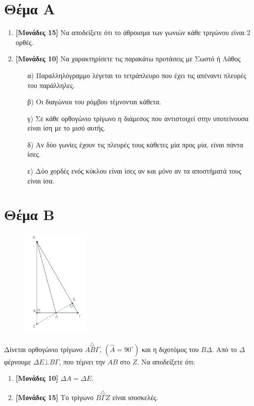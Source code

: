 \documentclass[12pt]{article}
\begin{document}
\section*{Θέμα Α}
  \noindent
  \begin{enumerate}
    \item \textbf{[Μονάδες 15]} Να αποδείξετε ότι το άθροισμα των γωνιών κάθε τριγώνου είναι $2$ ορθές.
    \item \textbf{[Μονάδες 10]}  Να χαρακτηρίσετε τις παρακάτω προτάσεις με Σωστό ή Λάθος
    \begin{enumerate}
      \item [α)] Παραλληλόγραμμο λέγεται το τετράπλευρο που έχει τις απέναντι πλευρές του παράλληλες.
      \item [β)] Οι διαγώνιοι του ρόμβου τέμνονται κάθετα.
      \item [γ)] Σε κάθε ορθογώνιο τρίγωνο η διάμεσος που αντιστοιχεί στην υποτείνουσα είναι ίση με το μισό αυτής.
      \item [δ)] Αν δύο γωνίες έχουν τις πλευρές τους κάθετες μία προς μία, είναι πάντα ίσες.
      \item [ε)] Δύο χορδές ενός κύκλου είναι ίσες αν και μόνο αν τα αποστήματά τους είναι ίσα.
    \end{enumerate}
  \end{enumerate}

\section*{Θέμα Β}
  \noindent
  \begin{figure}
    \centering
    \vspace{-60pt}
    \includegraphics[width=0.3\textwidth]{2017AGeo2}
  \end{figure}
  Δίνεται ορθογώνιο τρίγωνο $\overset{\triangle}{ΑΒΓ}$, $\left( \hat{Α}= 90^{\circ} \right)$ και η διχοτόμος του $ΒΔ$. Από το $Δ$ φέρνουμε $ΔΕ \bot ΒΓ$, που τέμνει την $ΑΒ$ στο $Ζ$. Να αποδείξετε ότι:
  \begin{enumerate}
    \item \textbf{[Μονάδες 10]} $ΔΑ=ΔΕ$.
    \item \textbf{[Μονάδες 15]} Το τρίγωνο $\overset{\triangle}{ΒΓΖ}$ είναι ισοσκελές.
  \end{enumerate}
  \newpage
\end{document}
